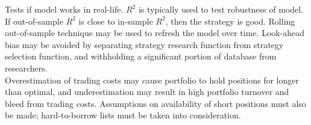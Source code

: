  Tests if model works in real-life. $R^2$ is typically used to test robustness of model. If out-of-sample $R^2$ is close to in-sample $R^2$, then the strategy is good. Rolling out-of-sample technique may be used to refresh the model over time. Look-ahead bias may be avoided by separating strategy research function from strategy selection function, and withholding a significant portion of database from researchers.\\

 Overestimation of trading costs may cause portfolio to hold positions for longer than optimal, and underestimation may result in high portfolio turnover and bleed from trading costs. Assumptions on availability of short positions must also be made; hard-to-borrow lists must be taken into consideration.